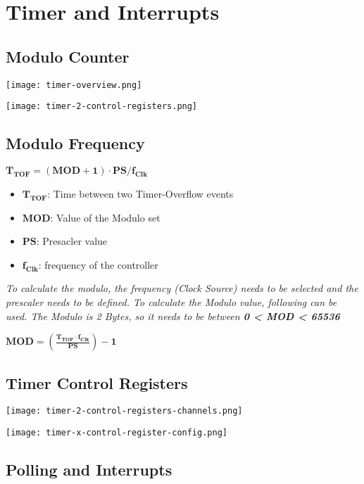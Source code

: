 \section{Timer and Interrupts}

\subsection{Modulo Counter}

\texttt{[image: timer-overview.png]}

\texttt{[image: timer-2-control-registers.png]}

\subsection{Modulo Frequency}

$\mathbf{T_{TOF} = (MOD + 1) \cdot PS / f_{Clk}}$
\newline
\begin{itemize}
    \item{$\mathbf{T_{TOF}}$: Time between two Timer-Overflow events}
    \item{$\mathbf{MOD}$: Value of the Modulo set}
    \item{$\mathbf{PS}$: Presacler value}
    \item{$\mathbf{f_{Clk}}$: frequency of the controller}
\end{itemize}

\textit{
    \newline
    To calculate the modulo, the frequency (Clock Source) needs to be selected
    and the prescaler needs to be defined. To calculate the Modulo value, following can
    be used. The Modulo is 2 Bytes, so it needs to be between \textbf{0 < MOD < 65536}
    \newline
}

$\mathbf{MOD = (\frac{T_{TOF} \cdot f_{Clk}}{PS}) - 1}$

\subsection{Timer Control Registers}

\texttt{[image: timer-2-control-registers-channels.png]}

\texttt{[image: timer-x-control-register-config.png]}

\subsection{Polling and Interrupts}

